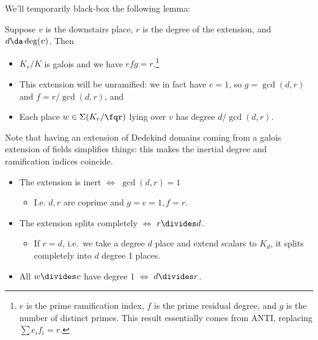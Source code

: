 We'll temporarily black-box the following lemma:

\begin{lemma}[?]

Suppose \(v\) is the downstairs place, \(r\) is the degree of the
extension, and \(d\da \deg(v)\). Then

\begin{itemize}
\item
  \(K_r/K\) is galois and we have \(efg = r\).\footnote{\(e\) is the
    prime ramification index, \(f\) is the prime residual degree, and
    \(g\) is the number of distinct primes. This result essentially
    comes from ANTI, replacing \(\sum e_i f_i = r\).}
\item
  This extension will be unramified: we in fact have \(e=1\), so
  \(g = \gcd(d, r)\) and \(f = r/\gcd(d, r)\), and
\item
  Each place \(w\in \Sigma(K_r/\fqr)\) lying over \(v\) has degree
  \(d/\gcd(d, r)\).
\end{itemize}

\end{lemma}

\begin{remark}

Note that having an extension of Dedekind domains coming from a galois
extension of fields simplifies things: this makes the inertial degree
and ramification indices coincide.

\end{remark}

\begin{example}[?]

\envlist

\begin{itemize}
\item
  The extension is inert \(\iff\) \(\gcd(d, r) = 1\)

  \begin{itemize}
  \tightlist
  \item
    I.e. \(d, r\) are coprime and \(g=e=1, f=r\).
  \end{itemize}
\item
  The extension splits completely \(\iff\) \(r \divides d\).

  \begin{itemize}
  \tightlist
  \item
    If \(r=d\), i.e.~we take a degree \(d\) place and extend scalars to
    \(K_d\), it splits completely into \(d\) degree 1 places.
  \end{itemize}
\item
  All \(w\divides v\) have degree 1 \(\iff\) \(d\divides r\).
\end{itemize}

\end{example}

